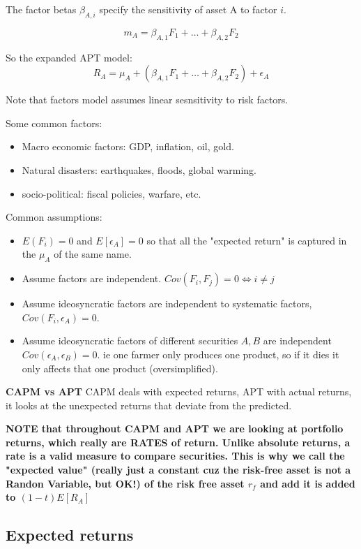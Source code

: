 \documentclass{article}
\begin{document}
The factor betas $\beta_{A, i}$ specify the sensitivity of asset A to factor $i$.

\[ m_A = \beta_{A, 1}F_1 + \dots + \beta_{A, 2}F_2\]

So the expanded APT model: 
\[ R_A = \mu_A + (\beta_{A, 1}F_1 + \dots + \beta_{A, 2}F_2)+ \epsilon_A
\]


 

Note that factors model assumes linear sesnsitivity to risk factors. 


Some common factors:
\begin{itemize}
\item Macro economic factors: GDP, inflation, oil, gold.
\item Natural disasters: earthquakes, floods, global warming.
\item socio-political: fiscal policies, warfare, etc.
\end{itemize}

Common assumptions: 
\begin{itemize}
\item $E(F_i) =0$ and $E[\epsilon_A] =0$ so that all the "expected return" is captured in the $\mu_A$ of the same name. 
\item Assume factors are independent. $Cov(F_i, F_j) = 0 \iff i \neq j$ 
\item Assume ideosyncratic factors are independent to systematic factors, $Cov(F_i, \epsilon_A) = 0$. 
\item Assume ideosyncratic factors of different securities $A, B$ are independent $Cov(\epsilon_A, \epsilon_B) = 0$. ie one farmer only produces one product, so if it dies it only affects that one product (oversimplified). 
\end{itemize}


\textbf{CAPM vs APT}
CAPM deals with expected returns, APT with actual returns, it looks at the unexpected returns that deviate from the predicted. 

\break

\textbf{NOTE that throughout CAPM and APT we are looking at portfolio returns, which really are RATES of return. Unlike absolute returns, a rate is a valid measure to compare securities. This is why we call the "expected value" (really just a constant cuz the risk-free asset is not a Randon Variable, but OK!) of the risk free asset $r_f$ and add it is added to $(1-t)E[R_A]$ }

\subsection{Expected returns}
\end{document}
